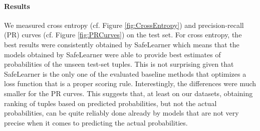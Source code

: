 \documentclass[akbc,twoside,11pt]{article}
\newcommand{\algorithmname}{SafeLearner\xspace}
\begin{document}
\paragraph{Results} We measured cross entropy (cf. Figure \ref{fig:CrossEntropy}) and precision-recall (PR) curves (cf. Figure \ref{fig:PRCurves}) on the test set. For cross entropy, the best results were consistently obtained by \algorithmname which means that the models obtained by \algorithmname were able to provide best estimates of probabilities of the unseen test-set tuples. This is not surprising given that \algorithmname is the only one of the evaluated baseline methods that optimizes a loss function that is a proper scoring rule. Interestingly, the differences were much smaller for the PR curves. This suggests that, at least on our datasets, obtaining ranking of tuples based on predicted probabilities, but not the actual probabilities, can be quite reliably done already by models that are not very precise when it comes to predicting the actual probabilities.
\end{document}

